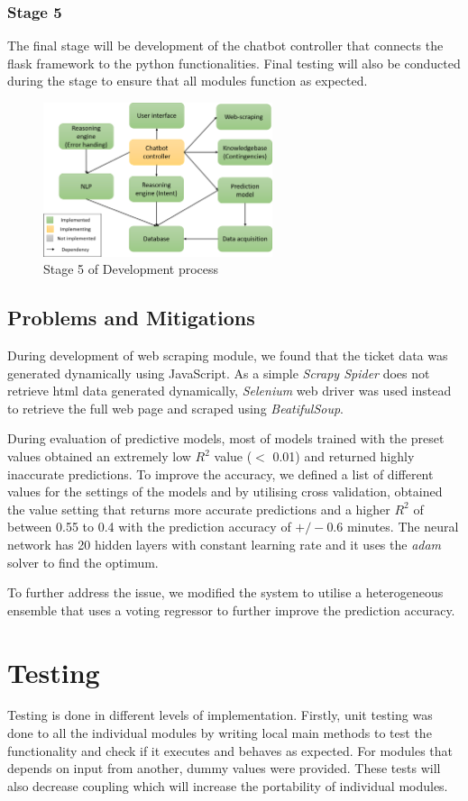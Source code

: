 \documentclass[11pt]{article}
\begin{document}
\subsubsection{Stage 5}
The final stage will be development of the chatbot controller that connects the flask framework to the python functionalities. Final testing will also be conducted during the stage to ensure that all modules function as expected. 
\begin{figure}[!htb]
	\centering
	\includegraphics[width=0.6\textwidth]{Stage_5}
	\caption{Stage 5 of Development process }\label{fig:Stage 5}
\end{figure}
\subsection{Problems and Mitigations} \label{Problems}
During development of web scraping module, we found that the ticket data was generated dynamically using JavaScript. As a simple \textit{Scrapy Spider} does not retrieve html data generated dynamically, \textit{Selenium} web driver was used instead to retrieve the full web page and scraped using \textit{BeatifulSoup}.

During evaluation of predictive models, most of models trained with the preset values obtained an extremely low $R^2$ value ($<$ 0.01) and returned highly inaccurate predictions. To improve the accuracy, we defined a list of different values for the settings of the models and by utilising cross validation, obtained the value setting that returns more accurate predictions and a higher $R^2$ of between 0.55 to 0.4 with the prediction accuracy of $+/-0.6$ minutes. The neural network has 20 hidden layers with constant learning rate and it uses the \textit{adam} solver to find the optimum.

To further address the issue, we modified the system to utilise a heterogeneous ensemble that uses a voting regressor to further improve the prediction accuracy.

\section{Testing}
Testing is done in different levels of implementation. Firstly, unit testing was done to all the individual modules by writing local main methods to test the functionality and check if it executes and behaves as expected. For modules that depends on input from another, dummy values were provided. These tests will also decrease coupling which will increase the portability of individual modules.
\end{document}
